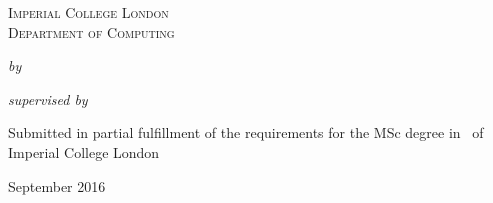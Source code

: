 \begin{titlepage}

\center

\textsc{\Large{Imperial College London}}\\[0.5cm] 
\textsc{\large{Department of Computing}}\\[0.5cm] 

\vspace{4cm}
\huge{\textbf{\reporttitle}}
\vspace{2cm}

\large{
  \emph{by} \\
  \vspace{0.1cm}
  \textbf{\name}
}

\vspace{1cm}


\large{
  \emph{supervised by} \\
  \vspace{0.1cm}
  \textbf{\supervisor}
}

\vfill %
\large{
Submitted in partial fulfillment of the requirements for the MSc degree in
\course~of Imperial College London\\[0.5cm]
}

\small{September 2016}

\end{titlepage}
